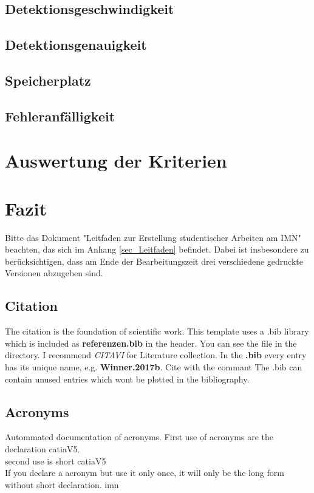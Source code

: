 \documentclass[12pt,
titlepage,
a4paper,
oneside,     %
openany,     %
listof=totoc,  %
numbers = noenddot, %
bibliography=totoc,    %
headsepline, %
]{scrbook} %
\begin{document}
\section{Detektionsgeschwindigkeit}
\label{sec_detgeschw}

\section{Detektionsgenauigkeit}
\label{sec_detgenau}

\section{Speicherplatz}
\label{sec_speicher}

\section{Fehleranfälligkeit}
\label{sec_fehler}


\chapter{Auswertung der Kriterien}
\label{cha:auswertung}


\chapter{Fazit}
\label{cha:fazit}
Bitte das Dokument "Leitfaden zur Erstellung studentischer Arbeiten am IMN" beachten, das sich im Anhang \ref{sec_Leitfaden} befindet. Dabei ist insbesondere zu berücksichtigen, dass am Ende der Bearbeitungszeit drei verschiedene gedruckte Versionen abzugeben sind.

\section{Citation}
\label{sec_citation}
The citation is the foundation of scientific work. This template uses a .bib library which is included as \textbf{referenzen.bib} in the header. You can see the file in the directory. I recommend \textit{CITAVI} for Literature collection.
In the \textbf{.bib} every entry has its unique name, e.g. \textbf{Winner.2017b}. Cite with the commant \cite{Winner.2017b}
The .bib can contain unused entries which wont be plotted in the bibliography.

\section{Acronyms}
\label{sec_acronyms}
Autommated documentation of acronyms.
First use of acronyms are the declaration \ac{catiaV5}.  \\
second use is short \ac{catiaV5} \\
If you declare a acronym but use it only once, it will only be the long form without short declaration. \ac{imn} 
\end{document}
